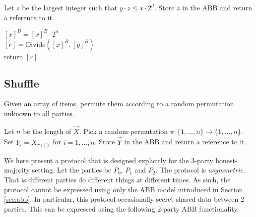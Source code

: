 \begin{functionality}[FixedPointDivide$({[x]^B}, {[y]^B}, d)$]
	Let $z$ be the largest integer such that $y \cdot z \leq x \cdot 2^d$.
	Store $z$ in the ABB and return a reference to it.
\end{functionality}

\begin{protocol}[FixedPointDivide$({[x]^B}, {[y]^B}, d)$]
	$[x]^B = [x]^B \cdot 2^d$\\
	$[r] = $Divide$([x]^B, [y]^B)$\\
	return $[r]$
\end{protocol}

\subsection{Shuffle}

Given an array of items, permute them according to a random permutation
unknown to all parties.

\begin{functionality}[Shuffle$({[\vec{X}]^B})$]
	Let $n$ be the length of $\vec{X}$.
	Pick a random permutation $\pi: \{1, \dots, n\} \rightarrow \{1, \ldots, n \}$.
	Set $Y_i = X_{\pi(i)}$ for $i = 1, \ldots, n$.
	Store $\vec{Y}$ in the ABB and return a reference to it.
\end{functionality}

We here present a protocol that is designed explicitly for the 3-party honest-majority
setting. Let the parties be $P_0$, $P_1$ and $P_2$.
The protocol is \emph{asymmetric}. 
That is different parties do different things at different times.
As such, the protocol cannot be expressed using only the ABB model introduced
in Section \ref{sec:abb}.
In particular, this protocol occasionally secret-shared data between 2 parties.
This can be expressed using the following 2-party ABB functionality.

